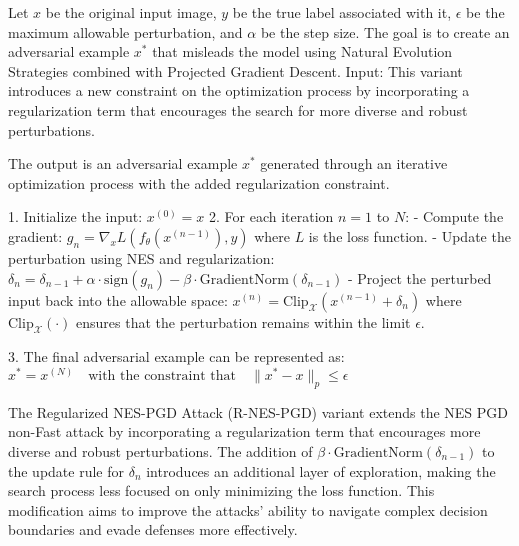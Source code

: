 Let $x$ be the original input image, $y$ be the true label associated with it, $\epsilon$ be the maximum allowable perturbation, and $\alpha$ be the step size. The goal is to create an adversarial example $x^*$ that misleads the model using Natural Evolution Strategies combined with Projected Gradient Descent.
Input: This variant introduces a new constraint on the optimization process by incorporating a regularization term that encourages the search for more diverse and robust perturbations.

The output is an adversarial example $x^*$ generated through an iterative optimization process with the added regularization constraint.

1. Initialize the input:
   $x^{(0)} = x$
2. For each iteration $n = 1$ to $N$:
   - Compute the gradient:
   $g_n = \nabla_x L(f_\theta(x^{(n-1)}), y)$
   where $L$ is the loss function.
   - Update the perturbation using NES and regularization:
   $\delta_n = \delta_{n-1} + \alpha \cdot \text{sign}(g_n) - \beta \cdot \text{GradientNorm}(\delta_{n-1})$
   - Project the perturbed input back into the allowable space:
   $x^{(n)} = \text{Clip}_{\mathcal{X}}(x^{(n-1)} + \delta_n)$
   where $\text{Clip}_{\mathcal{X}}(\cdot)$ ensures that the perturbation remains within the limit $\epsilon$.

3. The final adversarial example can be represented as:
   $x^* = x^{(N)} \quad \text{with the constraint that} \quad \|x^* - x\|_p \leq \epsilon$

The Regularized NES-PGD Attack (R-NES-PGD) variant extends the NES PGD non-Fast attack by incorporating a regularization term that encourages more diverse and robust perturbations. The addition of $\beta \cdot \text{GradientNorm}(\delta_{n-1})$ to the update rule for $\delta_n$ introduces an additional layer of exploration, making the search process less focused on only minimizing the loss function. This modification aims to improve the attacks' ability to navigate complex decision boundaries and evade defenses more effectively.